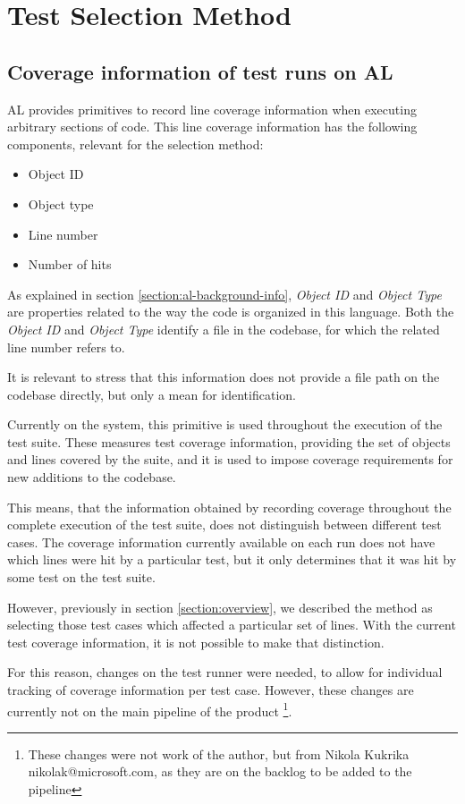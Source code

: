 \documentclass{article}
\begin{document}
\section{Test Selection Method}
\subsection{Coverage information of test runs on AL}\label{section:cov-info}
AL provides primitives to record line coverage information when executing arbitrary sections of code. This line coverage information has the following components, relevant for the selection method:
\begin{itemize}
\item Object ID
\item Object type
\item Line number
\item Number of hits
\end{itemize}

As explained in section \ref{section:al-background-info}, \emph{Object ID} and \emph{Object Type} are properties related to the way the code is organized in this language. Both the \emph{Object ID} and \emph{Object Type} identify a file in the codebase, for which the related line number refers to.

It is relevant to stress that this information does not provide a file path on the codebase directly, but only a mean for identification.

Currently on the system, this primitive is used throughout the execution of the test suite. These measures test coverage information, providing the set of objects and lines covered by the suite, and it is used to impose coverage requirements for new additions to the codebase.

This means, that the information obtained by recording coverage throughout the complete execution of the test suite, does not distinguish between different test cases. The coverage information currently available on each run does not have which lines were hit by a particular test, but it only determines that it was hit by some test on the test suite.

However, previously in section \ref{section:overview}, we described the method as selecting those test cases which affected a particular set of lines. With the current test coverage information, it is not possible to make that distinction.

For this reason, changes on the test runner were needed, to allow for individual tracking of coverage information per test case. However, these changes are currently not on the main pipeline of the product \footnote{These changes were not work of the author, but from Nikola Kukrika nikolak@microsoft.com, as they are on the backlog to be added to the pipeline}.
\end{document}
